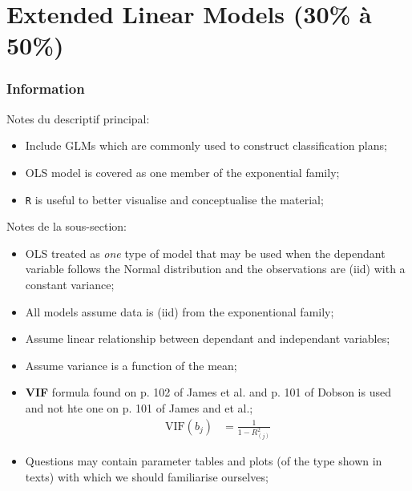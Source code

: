 \chapter[Extended Linear Models]{Extended Linear Models (30\% à 50\%)}

\subsection{Information}

\begin{distributions}[Description]
Notes du descriptif principal:
\begin{itemize}
	\item	Include GLMs which are commonly used to construct classification plans;
	\item	OLS model is covered as one member of the exponential family;
	\item	\texttt{R} is useful to better visualise and conceptualise the material;
\end{itemize}
\tcbline
Notes de la sous-section:
\begin{itemize}
	\item	OLS treated as \textit{one} type of model that may be used when the dependant variable follows the Normal distribution and the observations are (iid) with a constant variance;
	\item	All models assume data is (iid) from the exponentional family;
	\item	Assume linear relationship between dependant and independant variables;
	\item	Assume variance is a function of the mean;
	\item	\textbf{VIF} formula found on p. 102 of James et al. and p. 101 of Dobson is used and not hte one on p. 101 of James and et al.;
		\begin{align*}
			\text{VIF}(b_{j})
			&=	\frac{1}{1 - R_{(j)}^{2}}
		\end{align*}
	\item	Questions may contain parameter tables and plots (of the type shown in texts) with which we should familiarise ourselves;
\end{itemize}
\end{distributions}

